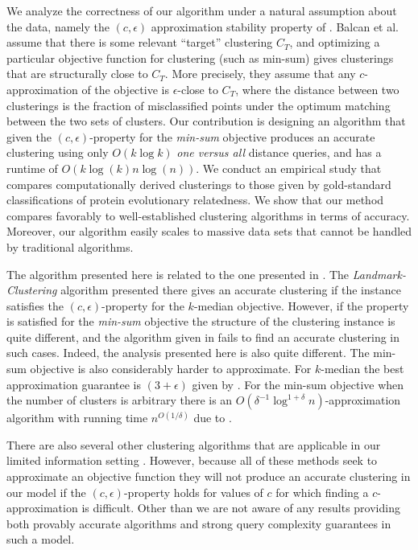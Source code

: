 \documentclass{llncs} \usepackage{algorithm}
\begin{document}
We analyze the correctness of our algorithm under a natural assumption about the data, namely the $(c,\epsilon)$ approximation stability property of \cite{bbg}.  Balcan et al. assume that there is some relevant ``target'' clustering $C_{T}$, and optimizing a particular objective function for clustering (such as min-sum) gives clusterings that are structurally close to $C_{T}$.  More precisely, they assume that any $c$-approximation of the objective is $\epsilon$-close to $C_{T}$, where the distance between two clusterings is the fraction of misclassified points under the optimum matching between the two sets of clusters.  Our contribution is designing an algorithm that given the $(c,\epsilon)$-property for the \emph{min-sum} objective produces an accurate clustering using only $O(k \log k)$ \emph{one versus all} distance queries, and has a runtime of $O(k \log (k) n \log (n))$.  We conduct an empirical study that compares computationally derived clusterings to those given by gold-standard classifications of protein evolutionary relatedness.  We show that our method compares favorably to well-established clustering algorithms in terms of accuracy.  Moreover, our algorithm easily scales to massive data sets that cannot be handled by traditional algorithms.

The algorithm presented here is related to the one presented in \cite{vbrtx}.  The \emph{Landmark-Clustering} algorithm presented there gives an accurate clustering if the instance satisfies the $(c,\epsilon)$-property for the $k$-median objective.  However, if the property is satisfied for the \emph{min-sum} objective the structure of the clustering instance is quite different, and the algorithm given in \cite{vbrtx} fails to find an accurate clustering in such cases.  Indeed, the analysis presented here is also quite different.  The min-sum objective is also considerably harder to approximate.  For $k$-median the best approximation guarantee is $(3+\epsilon)$ given by \cite{kMedApprox}.  For the min-sum objective when the number of clusters is arbitrary there is an $O(\delta^{-1} \log^{1+\delta}n)$-approximation algorithm with running time $n^{O(1/\delta)}$ due to \cite{bcr}.

There are also several other clustering algorithms that are applicable in our limited information setting \cite{av,ajm,sampleBasedClustering,sampleBasedClustering3}.  However, because all of these methods seek to approximate an objective function they will not produce an accurate clustering in our model if the $(c,\epsilon)$-property holds for values of $c$ for which finding a $c$-approximation is difficult.  Other than \cite{vbrtx} we are not aware of any results providing both provably accurate algorithms and strong query complexity guarantees in such a model.
\end{document}
